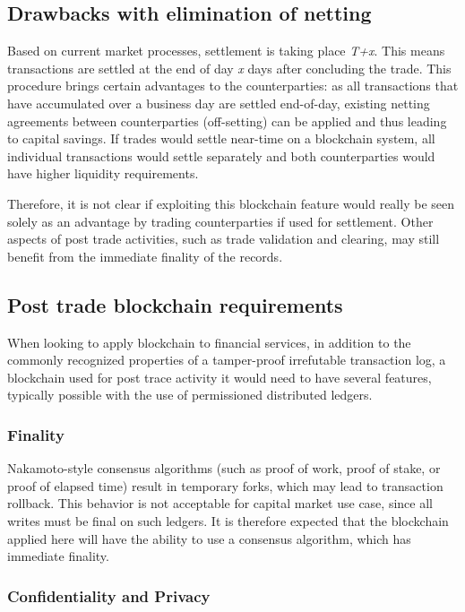 \subsection{Drawbacks with elimination of netting}
Based on current market processes, settlement is taking place \emph{T+x}. This means transactions are settled at the end of day \emph{x} days after concluding the trade. This procedure brings certain advantages to the counterparties: as all transactions that have accumulated over a business day are settled end-of-day, existing netting agreements between counterparties (off-setting) can be applied and thus leading to capital savings. If trades would settle near-time on a blockchain system, all individual transactions would settle separately and both counterparties would have higher liquidity requirements.

Therefore, it is not clear if exploiting this blockchain feature would really be seen solely as an advantage by trading counterparties if used for settlement. Other aspects of post trade activities, such as trade validation and clearing, may still benefit from the immediate finality of the records. 

\subsection{Post trade blockchain requirements}

When looking to apply blockchain to financial services, in addition to the commonly recognized properties of a tamper-proof irrefutable transaction log, a blockchain used for post trace activity it would need to have several features, typically possible with the use of permissioned distributed ledgers.

\subsubsection{Finality}

Nakamoto-style consensus algorithms (such as proof of work, proof of stake, or proof of elapsed time) result in temporary forks, which may lead to transaction rollback. This behavior is not acceptable for capital market use case, since all writes must be final on such ledgers. It is therefore expected that the blockchain applied here will have the ability to use a consensus algorithm, which has immediate finality.

\subsubsection{Confidentiality and Privacy}

